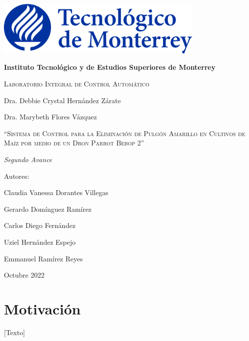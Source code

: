 \documentclass[11pt]{exam}
\begin{document}
    \begin{titlepage}
        \centering
        {\includegraphics[width = 4in]{pictures/itesm-logo.png}\par}
        \vspace{0.4in}
        {\bfseries\LARGE Instituto Tecnol\'ogico y de Estudios Superiores de Monterrey \par}
        \vspace{0.4in}
        {\scshape\Large Laboratorio Integral de Control Automático \par}
        {\Large Dra. Debbie Crystal Hernández Zárate \par}
        {\Large Dra. Marybeth Flores Vázquez \par}
        \vspace{1.2in}
        {\scshape\Large ``Sistema de Control para la Eliminaci\'on de Pulg\'on Amarillo en Cultivos de Maíz por medio de un Dron Parrot Bebop 2'' \par}
        \vspace{1.2in}
        {\itshape\Large Segundo Avance \par}
        \vfill
        {\Large Autores: \par}
        {\Large Claudia Vanessa Dorantes Villegas\par}
        {\Large Gerardo Dom\'inguez Ram\'irez\par}
        {\Large Carlos Diego Fernández\par}
        {\Large Uziel Hernández Espejo\par}
        {\Large Emmanuel Ramírez Reyes\par}
        \vfill
        {\Large Octubre 2022 \par}
    \end{titlepage}

    \headrule
    \footrule

    \section*{Motivaci\'on}
        [Texto]
\end{document}
